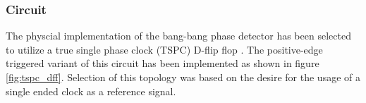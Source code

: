 




		\FloatBarrier






		\subsubsection{Circuit}
		The physcial implementation of the bang-bang phase detector has been selected to utilize a true single phase clock (TSPC) D-flip flop \cite{Yuan1989}. The positive-edge triggered variant of this circuit has been implemented as shown in figure \ref{fig:tspc_dff}. Selection of this topology was based on the desire for the usage of a single ended clock as a reference signal.

